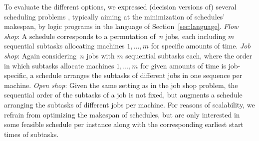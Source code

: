 To evaluate the different options,
we expressed (decision versions of) several scheduling problems \cite{taillard93a},
typically aiming at the minimization of schedules' makespan,
by logic programs in the language of Section~\ref{sec:language}.
%
\emph{Flow shop}:
A schedule corresponds to a permutation of~$n$ jobs,
each including $m$ sequential subtasks allocating
machines $1,\dots, m$ for specific amounts of time.
%
\emph{Job shop}:
Again considering~$n$ jobs with $m$ sequential subtasks each,
where the order in which subtasks allocate machines $1,\dots, m$ for given amounts of time
is job-specific,
a schedule arranges the subtasks of different jobs in one sequence per machine.
%
\emph{Open shop}:
Given the same setting as in the job shop problem,
the sequential order of the subtasks of a job is not fixed,
but augments a schedule arranging the subtasks of different jobs per machine.
%
For reasons of scalability,
we refrain from optimizing the makespan of schedules,
but are only interested in some feasible schedule per instance along with
the corresponding earliest start times of subtasks.

